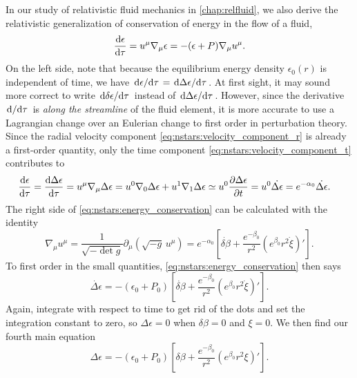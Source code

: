 In our study of relativistic fluid mechanics in \cref{chap:relfluid}, we also derive the relativistic generalization of conservation of energy in the flow of a fluid,
\begin{equation}
	\odv{\epsilon}{\tau} = u^\mu \nabla_\mu \epsilon = -(\epsilon+P) \nabla_\mu u^\mu  .
\label{eq:nstars:energy_conservation}
\end{equation}
On the left side, note that because the equilibrium energy density $\epsilon_0(r)$ is independent of time, we have $\odv{\epsilon}/{\tau} = \odv{\Delta \epsilon}/{\tau}$.
At first sight, it may sound more correct to write $\odv{\delta \epsilon}/{\tau}$ instead of $\odv{\Delta \epsilon}/{\tau}$.
However, since the derivative $\odv{}/{\tau}$ is \emph{along the streamline} of the fluid element, it is more accurate to use a Lagrangian change over an Eulerian change to first order in perturbation theory.
Since the radial velocity component \eqref{eq:nstars:velocity_component_r} is already a first-order quantity, only the time component \eqref{eq:nstars:velocity_component_t} contributes to
\begin{equation}
\begin{split}
	\odv{\epsilon}{\tau} =
	\odv{\Delta \epsilon}{\tau} =
	u^\mu \nabla_\mu \Delta \epsilon =
	u^0 \nabla_0 \Delta \epsilon + u^1 \nabla_1 \Delta \epsilon
	&\taylor u^0 \pdv{\Delta \epsilon}{t} = u^0 \dot{\Delta \epsilon} =
	e^{-\alpha_0} \dot{\Delta \epsilon} .
\end{split}
\end{equation}
The right side of \cref{eq:nstars:energy_conservation} can be calculated with the identity \cite[equation 3.34]{ref:carroll}
\begin{equation}
	\nabla_\mu u^\mu = \frac{1}{\sqrt{-\det{g}}} \partial_\mu \left( \sqrt{-g} \, u^\mu \right)
	                 = e^{-\alpha_0} \left[ \dot{\delta\beta} + \frac{e^{-\beta_0}}{r^2} \left( e^{\beta_0} r^2 \dot\xi \right)' \right] .
\end{equation}
To first order in the small quantities, \cref{eq:nstars:energy_conservation} then says
\begin{equation}
	\dot{\Delta \epsilon} = - \left( \epsilon_0 + P_0 \right) \left[ \dot{\delta\beta} + \frac{e^{-\beta_0}}{r^2} \left( e^{\beta_0} r^2 \dot\xi \right)' \right] .
\end{equation}
Again, integrate with respect to time to get rid of the dots and set the integration constant to zero, so $\Delta \epsilon = 0$ when $\delta \beta = 0$ and $\xi = 0$.
We then find our fourth main equation
\begin{equation}
	\Delta \epsilon = - \left( \epsilon_0 + P_0 \right) \left[ \delta\beta + \frac{e^{-\beta_0}}{r^2} \left( e^{\beta_0} r^2 \xi \right)' \right] .
\label{eq:nstars:Delta_epsilon}
\end{equation}

